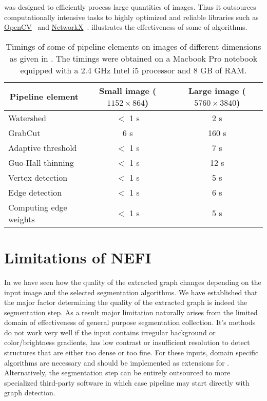 		\NEFI was designed to efficiently process large quantities of images. Thus it outsources computationally intensive tasks to highly optimized and reliable libraries such as \href{http://opencv.org/}{OpenCV}~\cite{opencv} and \href{https://networkx.github.io/documentation/latest/index.html}{NetworkX}~\cite{networkx}.  illustrates the effectiveness of some of \NEFIs algorithms. 


		\begin{table}
			\centering
			\begin{tabular}{@{} l *2c @{}}
			\toprule
			\multicolumn{1}{c}{Pipeline element}    & Small image ($1152 \times 864$)  & Large image ($5760 \times 3840$) \\ 
			\midrule
			Watershed & $<$ 1 \si{\second}  & 2 \si{\second}  \\
			GrabCut  & 6 \si{\second}  & 160 \si{\second}  \\
			Adaptive threshold & $<$ 1 \si{\second}  & 7 \si{\second}  \\
			Guo-Hall thinning &  $<$ 1 \si{\second}  & 12 \si{\second}  \\
			Vertex detection & $<$ 1 \si{\second}  & 5 \si{\second}  \\
			Edge detection & $<$ 1 \si{\second}   & 6 \si{\second}  \\
			Computing edge weights & $<$ 1 \si{\second}  & 5 \si{\second} \\
			\bottomrule
			\end{tabular}
			\caption[\NEFIs evaluation - Pipeline timings]{Timings of some of \NEFIs pipeline elements on images of different dimensions as given in \si{\pixel}. The timings were obtained on a Macbook Pro notebook equipped with a 2.4 GHz Intel i5 processor and 8 GB of RAM.}
			\label{tab:timings}
		\end{table}

\section{Limitations of NEFI}\label{sec:limitations}

		In  we have seen how the quality of the extracted graph changes depending on the input image and the selected segmentation algorithms. We have established that the major factor determining the quality of the extracted graph is indeed the segmentation step. As a result \NEFIs major limitation naturally arises from the limited domain of effectiveness of \NEFIs general purpose segmentation collection. It's methods do not work very well if the input contains irregular background or color/brightness gradients, has low contrast or insufficient resolution to detect structures that are either too dense or too fine. For these inputs, domain specific algorithms are necessary and should be implemented as extensions for \NEFI. Alternatively, the segmentation step can be entirely outsourced to more specialized third-party software in which case \NEFIs pipeline may start directly with graph detection.

